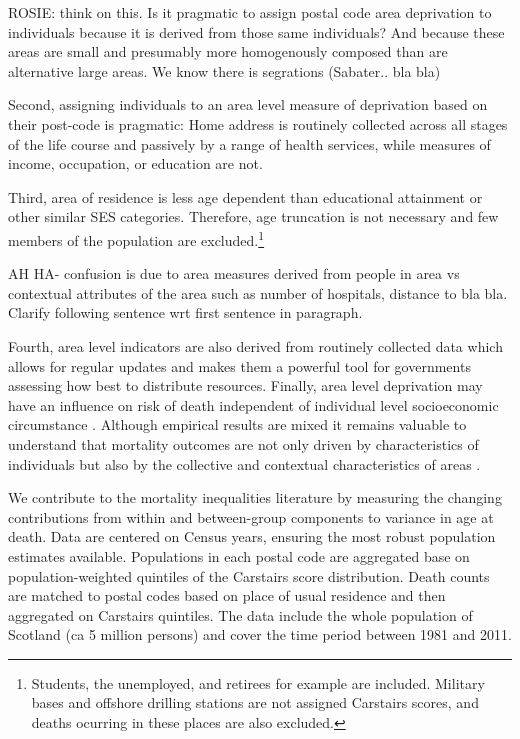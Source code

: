 \documentclass[12pt,oneside,a4paper]{article} %
\theoremstyle{definition}
\begin{document}
ROSIE: think on this. Is it pragmatic to assign postal code area deprivation to
individuals because it is derived from those same individuals? And because
these areas are small and presumably more homogenously composed than are
alternative large areas. We know there is segrations (Sabater.. bla bla)

 Second, assigning
individuals to an area level measure of deprivation based on their post-code is pragmatic: Home
address is routinely collected across all stages of the life course and
passively by a range of health services, while measures of income, occupation,
or education are not. 

Third, area of residence is less age dependent than educational attainment or
other similar SES categories.
Therefore, age truncation is not necessary and few members of the population
are excluded.\footnote{Students, the unemployed, and retirees for example are
included. Military bases and offshore drilling stations are not assigned
Carstairs scores, and deaths ocurring in these places are also excluded.}

AH HA- confusion is due to area measures derived from people in area vs
contextual attributes of the area such as number of hospitals, distance to bla
bla. Clarify following sentence wrt first sentence in paragraph.

 Fourth, area
level indicators are also derived from routinely collected data which allows for
regular updates and makes them a powerful tool for governments assessing how best to distribute resources. Finally, area level deprivation may have an influence on risk of death independent of individual level socioeconomic circumstance \citep{Carstairs1989,Macintyre2002,Tunstall2011}. Although empirical results are mixed it remains valuable to understand that mortality outcomes are not only driven by characteristics of individuals but also by the collective and contextual characteristics of areas \citep{Macintyre2002}.

We contribute to the mortality inequalities literature by measuring the changing contributions from within and
between-group components to variance in age at death. Data are centered on
Census years, ensuring the most robust population estimates available.
Populations in each postal code are aggregated base on population-weighted
quintiles of the Carstairs score distribution. Death counts are
matched to postal codes based on place of usual residence and then aggregated
on Carstairs quintiles. The data include the whole population of Scotland (ca 5
million persons) and cover the time period between 1981 and 2011.
\end{document}
